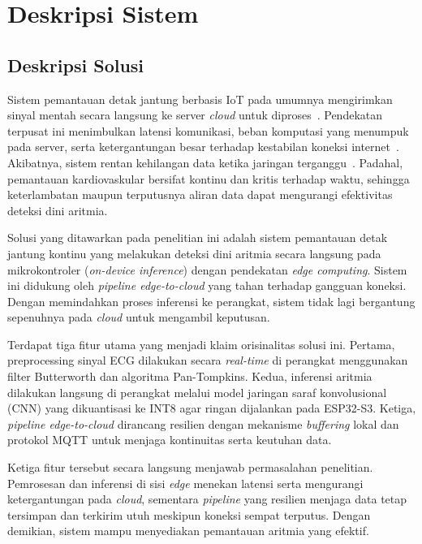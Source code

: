 \chapter{Deskripsi Sistem}

\section{Deskripsi Solusi}

Sistem pemantauan detak jantung berbasis IoT pada umumnya mengirimkan sinyal mentah secara langsung ke server \textit{cloud} untuk diproses~\cite{kim_2023, escobedo_2026}. Pendekatan terpusat ini menimbulkan latensi komunikasi, beban komputasi yang menumpuk pada server, serta ketergantungan besar terhadap kestabilan koneksi internet~\cite{al_quayed_2026, kim_2023}. Akibatnya, sistem rentan kehilangan data ketika jaringan terganggu~\cite{escobedo_2026}. Padahal, pemantauan kardiovaskular bersifat kontinu dan kritis terhadap waktu, sehingga keterlambatan maupun terputusnya aliran data dapat mengurangi efektivitas deteksi dini aritmia.

Solusi yang ditawarkan pada penelitian ini adalah sistem pemantauan detak jantung kontinu yang melakukan deteksi dini aritmia secara langsung pada mikrokontroler (\textit{on-device inference}) dengan pendekatan \textit{edge computing}. Sistem ini didukung oleh \textit{pipeline edge-to-cloud} yang tahan terhadap gangguan koneksi. Dengan memindahkan proses inferensi ke perangkat, sistem tidak lagi bergantung sepenuhnya pada \textit{cloud} untuk mengambil keputusan.

Terdapat tiga fitur utama yang menjadi klaim orisinalitas solusi ini. Pertama, preprocessing sinyal ECG dilakukan secara \textit{real-time} di perangkat menggunakan filter Butterworth dan algoritma Pan-Tompkins. Kedua, inferensi aritmia dilakukan langsung di perangkat melalui model jaringan saraf konvolusional (CNN) yang dikuantisasi ke INT8 agar ringan dijalankan pada ESP32-S3. Ketiga, \textit{pipeline edge-to-cloud} dirancang resilien dengan mekanisme \textit{buffering} lokal dan protokol MQTT untuk menjaga kontinuitas serta keutuhan data.

Ketiga fitur tersebut secara langsung menjawab permasalahan penelitian. Pemrosesan dan inferensi di sisi \textit{edge} menekan latensi serta mengurangi ketergantungan pada \textit{cloud}, sementara \textit{pipeline} yang resilien menjaga data tetap tersimpan dan terkirim utuh meskipun koneksi sempat terputus. Dengan demikian, sistem mampu menyediakan pemantauan aritmia yang efektif.

